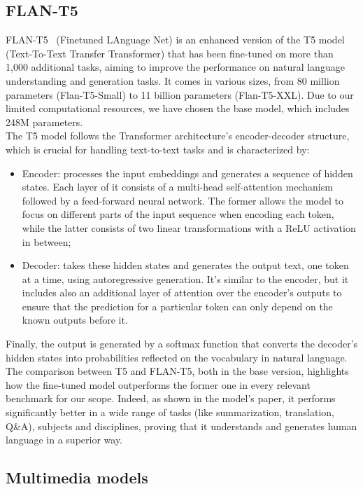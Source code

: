 \documentclass[10pt,twocolumn,letterpaper]{article}
\begin{document}
\subsection{FLAN-T5}

FLAN-T5~\cite{chung2022scalinginstructionfinetunedlanguagemodels} (Finetuned LAnguage Net) is an enhanced version of the T5 model (Text-To-Text Transfer Transformer) that has been fine-tuned on more than 1,000 additional tasks, aiming to improve the performance on natural language understanding and generation tasks. It comes in various sizes, from 80 million parameters (Flan-T5-Small) to 11 billion parameters (Flan-T5-XXL). Due to our limited computational resources, we have chosen the base model, which includes 248M parameters.\\
The T5 model follows the Transformer architecture’s encoder-decoder structure, which is crucial for handling text-to-text tasks and is characterized by:
\begin{itemize}
    \item Encoder: processes the input embeddings and generates a sequence of hidden states. Each layer of it consists of a multi-head self-attention mechanism followed by a feed-forward neural network. The former allows the model to focus on different parts of the input sequence when encoding each token, while the latter consists of two linear transformations with a ReLU activation in between;
    \item Decoder: takes these hidden states and generates the output text, one token at a time, using autoregressive generation. It's similar to the encoder, but it includes also an additional layer of attention over the encoder’s outputs to ensure that the prediction for a particular token can only depend on the known outputs before it.
\end{itemize}
Finally, the output is generated by a softmax function that converts the decoder's hidden states into probabilities reflected on the vocabulary in natural language. \\
The comparison between T5 and FLAN-T5, both in the base version, highlights how the fine-tuned model outperforms the former one in every relevant benchmark for our scope. Indeed, as shown in the model's paper, it performs significantly better in a wide range of tasks (like summarization, translation, Q\&A), subjects and disciplines, proving that it understands and generates human language in a superior way. 

\subsection{Multimedia models}
\end{document}

